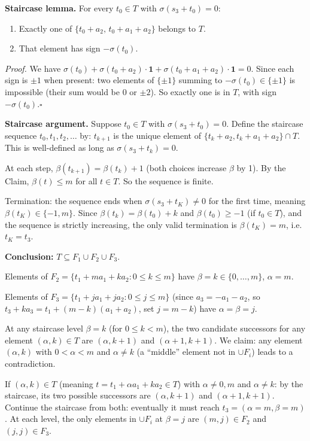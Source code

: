 \medskip\noindent
\textbf{Staircase lemma.}  For every \(t_0\in T\) with \(\sigma(s_3+t_0)=0\):
\begin{enumerate}
  \item Exactly one of \(\{t_0+a_2,\,t_0+a_1+a_2\}\) belongs to \(T\).
  \item That element has sign \(-\sigma(t_0)\).
\end{enumerate}

\smallskip\noindent\textit{Proof.}
We have \(\sigma(t_0)+\sigma(t_0+a_2)\cdot\mathbf{1}+\sigma(t_0+a_1+a_2)\cdot\mathbf{1}=0\).  Since each sign is \(\pm 1\) when present: two elements of \(\{\pm 1\}\) summing to \(-\sigma(t_0)\in\{\pm 1\}\) is impossible (their sum would be \(0\) or \(\pm 2\)).  So exactly one is in \(T\), with sign \(-\sigma(t_0)\).\hfill\(\square\)

\medskip\noindent
\textbf{Staircase argument.}  Suppose \(t_0\in T\) with \(\sigma(s_3+t_0)=0\).  Define the staircase sequence \(t_0,t_1,t_2,\dots\) by: \(t_{k+1}\) is the unique element of \(\{t_k+a_2,t_k+a_1+a_2\}\cap T\).  This is well-defined as long as \(\sigma(s_3+t_k)=0\).

At each step, \(\beta(t_{k+1})=\beta(t_k)+1\) (both choices increase \(\beta\) by 1).  By the Claim, \(\beta(t)\le m\) for all \(t\in T\).  So the sequence is finite.

Termination: the sequence ends when \(\sigma(s_3+t_K)\ne 0\) for the first time, meaning \(\beta(t_K)\in\{-1,m\}\).  Since \(\beta(t_k)=\beta(t_0)+k\) and \(\beta(t_0)\ge -1\) (if \(t_0\in T\)), and the sequence is strictly increasing, the only valid termination is \(\beta(t_K)=m\), i.e.\ \(t_K=t_3\).

\medskip\noindent
\textbf{Conclusion: }$T\subseteq F_1\cup F_2\cup F_3$.

Elements of \(F_2=\{t_1+ma_1+ka_2:0\le k\le m\}\) have \(\beta=k\in\{0,\dots,m\}\), \(\alpha=m\).

Elements of \(F_3=\{t_1+ja_1+ja_2:0\le j\le m\}\) (since \(a_3=-a_1-a_2\), so \(t_3+ka_3=t_1+(m-k)(a_1+a_2)\), set \(j=m-k\)) have \(\alpha=\beta=j\).

At any staircase level \(\beta=k\) (for \(0\le k<m\)), the two candidate successors for any element \(({\alpha},k)\in T\) are \((\alpha,k+1)\) and \((\alpha+1,k+1)\).  We claim:  any element \((\alpha,k)\) with \(0<\alpha<m\) and \(\alpha\ne k\) (a ``middle'' element not in \(\cup F_i\)) leads to a contradiction.

If \((\alpha,k)\in T\) (meaning \(t=t_1+\alpha a_1+ka_2\in T\)) with \(\alpha\ne 0,m\) and \(\alpha\ne k\):  by the staircase, its two possible successors are \(({\alpha},k+1)\) and \((\alpha+1,k+1)\).  Continue the staircase from both: eventually it must reach \(t_3=(\alpha=m,\beta=m)\).  At each level, the only elements in \(\cup F_i\) at \(\beta=j\) are \((m,j)\in F_2\) and \((j,j)\in F_3\).

